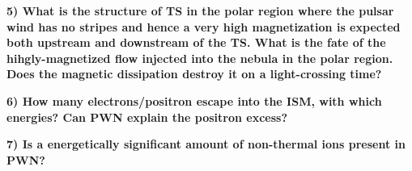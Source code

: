 \textbf{5) What is the structure of TS in the polar region where the pulsar wind has no stripes and hence a very high magnetization is expected both upstream and downstream of the TS. What is the fate of the hihgly-magnetized flow injected into the nebula in the polar region. Does the magnetic dissipation destroy it on a light-crossing time? }

\textbf{6) How many electrons/positron escape into the ISM, with which energies? Can PWN explain the positron excess?}

\textbf{7) Is a energetically significant amount of non-thermal  ions present in PWN?}
